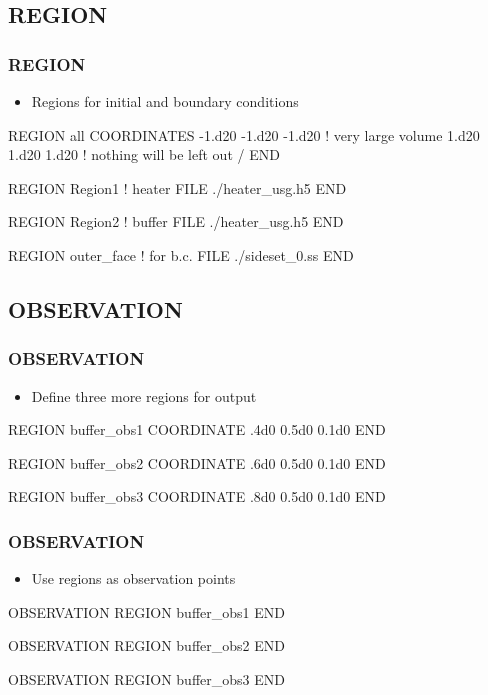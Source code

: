 \documentclass{beamer}
\newcommand\bluecomment[1]{{{\color{blue} #1}}}
\newcommand\greencomment[1]{{{\color{green} #1}}}
\begin{document}
\subsection{REGION}

\begin{frame}[fragile]\frametitle{REGION}
\begin{itemize}
  \item{Regions for initial and boundary conditions}
\end{itemize}

\begin{semiverbatim}\small
REGION \greencomment{all}
  COORDINATES
    -1.d20 -1.d20 -1.d20 \bluecomment{! very large volume}
     1.d20  1.d20  1.d20 \bluecomment{! nothing will be left out}
  /
END

REGION \greencomment{Region1} \bluecomment{! heater}
  FILE ./heater_usg.h5
END

REGION \greencomment{Region2} \bluecomment{! buffer}
  FILE ./heater_usg.h5
END

REGION \greencomment{outer_face} \bluecomment{! for b.c.}
  FILE ./sideset_0.ss
END
\end{semiverbatim}
\end{frame}
\subsection{OBSERVATION}

\begin{frame}[fragile]\frametitle{OBSERVATION}
\begin{itemize}
  \item{Define three more regions for output}
\end{itemize}

\begin{semiverbatim}\small
REGION buffer_obs1
  COORDINATE .4d0 0.5d0 0.1d0
END

REGION buffer_obs2
  COORDINATE .6d0 0.5d0 0.1d0
END

REGION buffer_obs3
  COORDINATE .8d0 0.5d0 0.1d0
END
\end{semiverbatim}
\end{frame}

\begin{frame}[fragile]\frametitle{OBSERVATION}
\begin{itemize}
  \item{Use regions as observation points}
\end{itemize}

\begin{semiverbatim}\small
OBSERVATION
  REGION buffer_obs1
END

OBSERVATION
  REGION buffer_obs2
END

OBSERVATION
  REGION buffer_obs3
END
\end{semiverbatim}
\end{frame}
\end{document}
